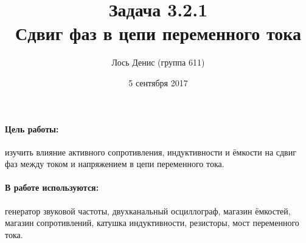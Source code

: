 \documentclass[12pt]{article}
\title{{\bf Задача 3.2.1\\ Сдвиг фаз в цепи переменного тока}}
\author{Лось Денис (группа 611)}
\date{5 сентября 2017}
\begin{document}
\maketitle

\paragraph{Цель работы: } изучить влияние активного сопротивления, индуктивности и ёмкости на сдвиг фаз между током и напряжением в цепи переменного тока.

\paragraph{В работе используются: } генератор звуковой частоты, двухканальный осциллограф, магазин ёмкостей, магазин сопротивлений, катушка индуктивности, резисторы, мост переменного тока.
\end{document}
